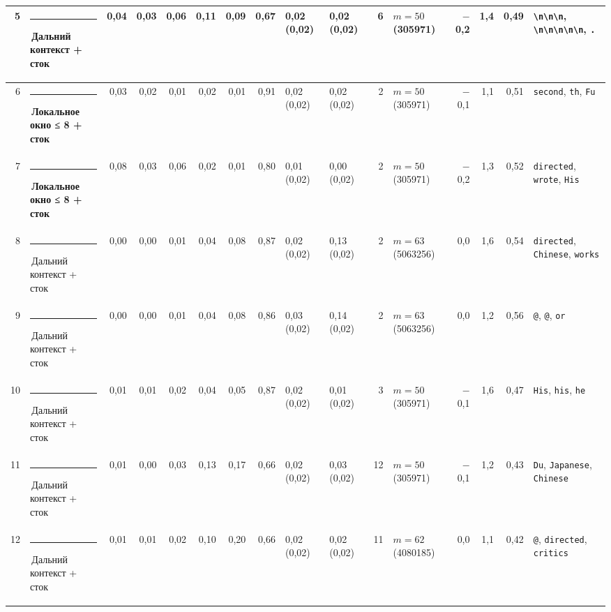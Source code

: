\documentclass[10pt]{article}
\begin{document}
\begin{minipage}{\linewidth}
\begin{center}
{\begin{tabular}{|r|l|r|r|r|r|r|r|l|l|r|l|r|r|r|l|}
5 & \textcolor[HTML]{C3C2B7}{\rule{0.62em}{0.62em}}\,Дальний контекст + сток & 0,04 & 0,03 & 0,06 & 0,11 & 0,09 & 0,67 & 0,02 (0,02) & 0,02 (0,02) & 6 & $m{=}50$ (305971) & $-$0,2 & 1,4 & 0,49 & \texttt{\textvisiblespace{}\textbackslash{}n\textbackslash{}n\textbackslash{}n}, \texttt{\textvisiblespace{}\textbackslash{}n\textbackslash{}n\textbackslash{}n\textbackslash{}n\textbackslash{}n}, \texttt{\textvisiblespace{}.} \\ \hline
6 & \textcolor[HTML]{1BAF7A}{\rule{0.62em}{0.62em}}\,\textbf{Локальное окно ≤ 8 + сток} & 0,03 & 0,02 & 0,01 & 0,02 & 0,01 & 0,91 & 0,02 (0,02) & 0,02 (0,02) & 2 & $m{=}50$ (305971) & $-$0,1 & 1,1 & 0,51 & \texttt{\textvisiblespace{}second}, \texttt{th}, \texttt{\textvisiblespace{}Fu} \\ \hline
7 & \textcolor[HTML]{1BAF7A}{\rule{0.62em}{0.62em}}\,\textbf{Локальное окно ≤ 8 + сток} & 0,08 & 0,03 & 0,06 & 0,02 & 0,01 & 0,80 & 0,01 (0,02) & 0,00 (0,02) & 2 & $m{=}50$ (305971) & $-$0,2 & 1,3 & 0,52 & \texttt{\textvisiblespace{}directed}, \texttt{\textvisiblespace{}wrote}, \texttt{\textvisiblespace{}His} \\ \hline
8 & \textcolor[HTML]{C3C2B7}{\rule{0.62em}{0.62em}}\,Дальний контекст + сток & 0,00 & 0,00 & 0,01 & 0,04 & 0,08 & 0,87 & 0,02 (0,02) & 0,13 (0,02) & 2 & $m{=}63$ (5063256) & 0,0 & 1,6 & 0,54 & \texttt{\textvisiblespace{}directed}, \texttt{\textvisiblespace{}Chinese}, \texttt{\textvisiblespace{}works} \\ \hline
9 & \textcolor[HTML]{C3C2B7}{\rule{0.62em}{0.62em}}\,Дальний контекст + сток & 0,00 & 0,00 & 0,01 & 0,04 & 0,08 & 0,86 & 0,03 (0,02) & 0,14 (0,02) & 2 & $m{=}63$ (5063256) & 0,0 & 1,2 & 0,56 & \texttt{\textvisiblespace{}@}, \texttt{@}, \texttt{\textvisiblespace{}or} \\ \hline
10 & \textcolor[HTML]{C3C2B7}{\rule{0.62em}{0.62em}}\,Дальний контекст + сток & 0,01 & 0,01 & 0,02 & 0,04 & 0,05 & 0,87 & 0,02 (0,02) & 0,01 (0,02) & 3 & $m{=}50$ (305971) & $-$0,1 & 1,6 & 0,47 & \texttt{\textvisiblespace{}His}, \texttt{\textvisiblespace{}his}, \texttt{\textvisiblespace{}he} \\ \hline
11 & \textcolor[HTML]{C3C2B7}{\rule{0.62em}{0.62em}}\,Дальний контекст + сток & 0,01 & 0,00 & 0,03 & 0,13 & 0,17 & 0,66 & 0,02 (0,02) & 0,03 (0,02) & 12 & $m{=}50$ (305971) & $-$0,1 & 1,2 & 0,43 & \texttt{\textvisiblespace{}Du}, \texttt{\textvisiblespace{}Japanese}, \texttt{\textvisiblespace{}Chinese} \\ \hline
12 & \textcolor[HTML]{C3C2B7}{\rule{0.62em}{0.62em}}\,Дальний контекст + сток & 0,01 & 0,01 & 0,02 & 0,10 & 0,20 & 0,66 & 0,02 (0,02) & 0,02 (0,02) & 11 & $m{=}62$ (4080185) & 0,0 & 1,1 & 0,42 & \texttt{\textvisiblespace{}@}, \texttt{\textvisiblespace{}directed}, \texttt{\textvisiblespace{}critics} \\ \hline

\end{tabular}}
\end{center}
\end{minipage}
\end{document}
